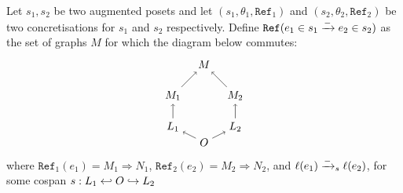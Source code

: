 \begin{definition}
  \label{def:ref_neg_infl}
  Let $s_1,s_2$ be two augmented posets and let $(s_1,\theta_1,\mathtt{Ref}_1)$ and $(s_2,\theta_2,\mathtt{Ref}_2)$ be two concretisations for $s_1$ and $s_2$ respectively.
  Define $\mathtt{Ref}(e_1\in s_1\mathrel{\xrightarrow{-}} e_2\in s_2)$ as the set of graphs $M$ for which the diagram below commutes:
  \[
  \begin{tikzpicture} %
    \node (o) at (0,-0.5) {\(O\)};
    \node (n) at (0,2) {\(M\)};
    \node (l1) at (-1,0) {\(L_1\)};
    \node (l2) at (1,0) {\(L_2\)};
    \node (n1) at (-1,1) {\(M_1\)};
    \node (n2) at (1,1) {\(M_2\)};
    \draw [->] (l1) -- (n1);
    \draw [->] (l2) -- (n2);
    \draw [->] (o) -- (l1);
    \draw [->] (o) -- (l2);
    \draw [->] (n1) -- (n);
    \draw [->] (n2) -- (n);
  \end{tikzpicture}
  \]
  where $\mathtt{Ref}_1(e_1) = M_1\Rightarrow N_1$, $\mathtt{Ref}_2(e_2) = M_2\Rightarrow N_2$, and $\ell(e_1)\mathrel{\xrightarrow{-}}_s\ell(e_2)$, for some cospan $s:L_1\hookleftarrow O\hookrightarrow L_2$
\end{definition}
